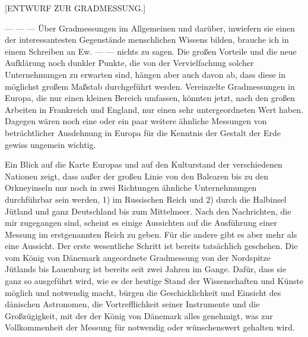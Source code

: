 \par{}\bigskip
{}%
\begin{center}\large [ENTWURF ZUR GRADMESSUNG.]\end{center}
\par
— — — Über Gradmessungen im Allgemeinen und darüber, inwiefern sie einen der interessantesten Gegenstände menschlichen Wissens bilden, brauche ich in einem Schreiben an Ew. — — nichts zu sagen. Die großen Vorteile und die neue Aufklärung noch dunkler Punkte, die von der Vervielfachung solcher Unternehmungen zu erwarten sind, hängen aber auch davon ab, dass diese in möglichst großem Maßstab durchgeführt werden. Vereinzelte Gradmessungen in Europa, die nur einen kleinen Bereich umfassen, könnten jetzt, nach den großen Arbeiten in Frankreich und England, nur einen sehr untergeordneten Wert haben. Dagegen wären noch eine oder ein paar weitere ähnliche Messungen von beträchtlicher Ausdehnung in Europa für die Kenntnis der Gestalt der Erde gewiss ungemein wichtig.

Ein Blick auf die Karte Europas und auf den Kulturstand der verschiedenen Nationen zeigt, dass außer der großen Linie von den Balearen bis zu den Orkneyinseln nur noch in zwei Richtungen ähnliche Unternehmungen durchführbar sein werden, 1) im Russischen Reich und 2) durch die Halbinsel Jütland und ganz Deutschland bis zum Mittelmeer. Nach den Nachrichten, die mir zugegangen sind, scheint es einige Aussichten auf die Ausführung einer Messung im erstgenannten Reich zu geben. Für die andere gibt es aber mehr als eine Aussicht. Der erste wesentliche Schritt ist bereits tatsächlich geschehen. Die vom König von Dänemark angeordnete Gradmessung von der Nordspitze Jütlands bis Lauenburg ist bereits seit zwei Jahren im Gange. Dafür, dass sie ganz so ausgeführt wird, wie es der heutige Stand der Wissenschaften und Künste möglich und notwendig macht, bürgen die Geschicklichkeit und Einsicht des dänischen Astronomen, die Vortrefflichkeit seiner Instrumente und die Großzügigkeit, mit der der König von Dänemark alles genehmigt, was zur Vollkommenheit der Messung für notwendig oder wünschenswert gehalten wird.

